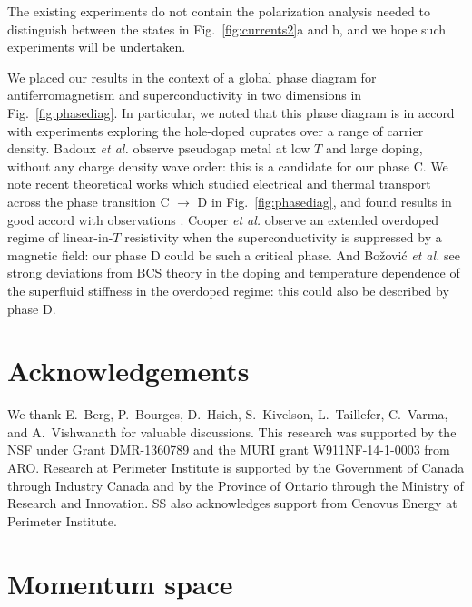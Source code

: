 \documentclass[aps,prb,preprint,onecolumn,citeautoscript,superscriptaddress,footinbib,
eqsecnum]{revtex4-1}
\begin{document}
The existing experiments \cite{2016NatPh..12...32Z,2017arXiv170106485J} do not contain the polarization analysis needed to distinguish
between the states in Fig.~\ref{fig:currents2}a and b, and we hope such experiments will be undertaken.

We placed our results in the context of a global phase diagram for antiferromagnetism and superconductivity in two dimensions in Fig.~\ref{fig:phasediag}. In particular, we noted that this
phase diagram \cite{SS09,DCSS15b,DCSS16} is in accord with experiments exploring 
the hole-doped cuprates over a range of carrier density. 
Badoux {\it et al.\/} \cite{LTCP15} observe pseudogap metal at low $T$ and large doping, without
any charge density wave order: this is a candidate for our phase C. We note recent theoretical works \cite{2016PhRvL.117r7001E,CSE17} which studied electrical and thermal
transport across the phase transition C $\rightarrow$ D in Fig.~\ref{fig:phasediag},
and found results in good accord with observations \cite{LTCP15,Laliberte2016-arXiv,Collignon2016-arXiv,Michon2017}.
Cooper {\it et al.\/} \cite{Cooper603} observe an extended overdoped regime of linear-in-$T$
resistivity when the superconductivity is suppressed by a magnetic field: our phase D could be
such a critical phase. And Bo{\v z}ovi{\'c} {\em et al.\/} \cite{Bozovic} see strong deviations
from BCS theory in the doping and temperature dependence of the superfluid stiffness in the overdoped
regime: this could also be described by phase D.



\section*{Acknowledgements}

We thank E.~Berg, P.~Bourges, D.~Hsieh, S.~Kivelson, L.~Taillefer, C.~Varma, and A.~Vishwanath for valuable discussions.
This research was supported by the NSF under Grant DMR-1360789 and the MURI grant W911NF-14-1-0003 from ARO. Research at Perimeter Institute is supported by the Government of Canada through Industry Canada and by the Province of Ontario through the Ministry of Research and Innovation. SS also acknowledges support from Cenovus Energy at Perimeter Institute. 


\appendix

\section{Momentum space}
\label{app:mom}
\end{document}
